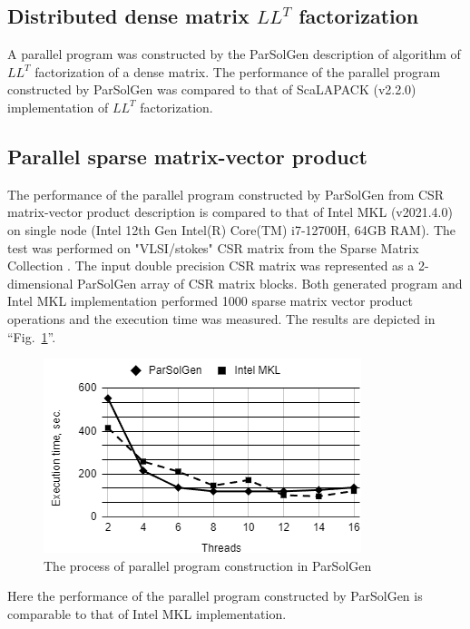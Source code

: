 \documentclass[conference]{IEEEtran}
\begin{document}
\subsection{Distributed dense matrix \(LL^T\) factorization}
A parallel program was constructed by the ParSolGen description of algorithm of 
\(LL^T\) factorization of a dense matrix. The performance of the parallel program 
constructed by ParSolGen was compared to that of ScaLAPACK (v2.2.0) implementation of \(LL^T\) 
factorization. 

\subsection{Parallel sparse matrix-vector product}
The performance of the parallel program constructed by ParSolGen from CSR matrix-vector 
product description is compared to that of Intel MKL (v2021.4.0) on single node 
(Intel 12th Gen Intel(R) Core(TM) i7-12700H, 64GB RAM). The test was performed on 
"VLSI/stokes" CSR matrix from the Sparse Matrix Collection \cite{spcol}. 
The input double precision CSR matrix was represented 
as a 2-dimensional ParSolGen array of CSR matrix blocks. Both generated program and Intel 
MKL implementation performed 1000 sparse matrix vector product operations and the execution 
time was measured.
The results are depicted in ``Fig.~\ref{fig_perf_spmv_mkl}''.
\begin{figure}[htbp]
	\centerline{\includegraphics[scale=0.8]{fig_perf_spmv_mkl.png}}
	\caption{The process of parallel program construction in ParSolGen}
	\label{fig_perf_spmv_mkl}
\end{figure}
Here the performance of the parallel program constructed by ParSolGen is comparable to 
that of Intel MKL implementation.

\subsection{}
\end{document}
